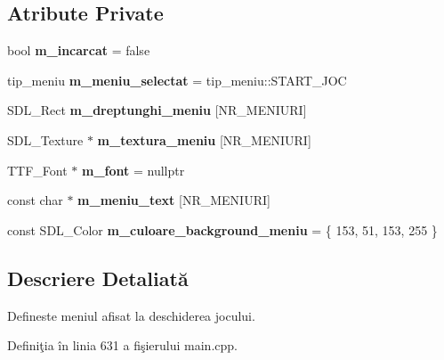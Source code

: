 \subsection*{Atribute Private}
\begin{DoxyCompactItemize}
\item 
\mbox{\label{classMeniuStart_a9d934fb5c51907f5f0bce6d259cdeb24}} 
bool {\bfseries m\+\_\+incarcat} = false
\item 
\mbox{\label{classMeniuStart_aea1b80044a1dce077fd9bd052bbfe279}} 
tip\+\_\+meniu {\bfseries m\+\_\+meniu\+\_\+selectat} = tip\+\_\+meniu\+::\+S\+T\+A\+R\+T\+\_\+\+J\+OC
\item 
\mbox{\label{classMeniuStart_a0428348c2459b05e54c32ee3835a80cf}} 
S\+D\+L\+\_\+\+Rect {\bfseries m\+\_\+dreptunghi\+\_\+meniu} \mbox{[}N\+R\+\_\+\+M\+E\+N\+I\+U\+RI\mbox{]}
\item 
\mbox{\label{classMeniuStart_acd083e350cda462b27e3cfccc2ca4298}} 
S\+D\+L\+\_\+\+Texture $\ast$ {\bfseries m\+\_\+textura\+\_\+meniu} \mbox{[}N\+R\+\_\+\+M\+E\+N\+I\+U\+RI\mbox{]}
\item 
\mbox{\label{classMeniuStart_a6982327ecd2eb251a25da2651b1ee80a}} 
T\+T\+F\+\_\+\+Font $\ast$ {\bfseries m\+\_\+font} = nullptr
\item 
\mbox{\label{classMeniuStart_a93aae50a78dc2df745728a2e8b6bbb11}} 
const char $\ast$ {\bfseries m\+\_\+meniu\+\_\+text} \mbox{[}N\+R\+\_\+\+M\+E\+N\+I\+U\+RI\mbox{]}
\item 
\mbox{\label{classMeniuStart_a9b6b148717c5fd9f860bc046ecac255c}} 
const S\+D\+L\+\_\+\+Color {\bfseries m\+\_\+culoare\+\_\+background\+\_\+meniu} = \{ 153, 51, 153, 255 \}
\end{DoxyCompactItemize}


\subsection{Descriere Detaliată}
Defineste meniul afisat la deschiderea jocului. 

Definiţia în linia 631 a fişierului main.\+cpp.



